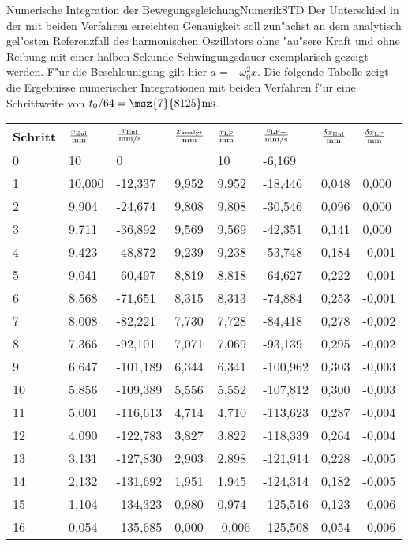 \begin{MXContent}{Numerische Integration der Bewegungsgleichung}{Numerik}{STD}
Der Unterschied in der mit beiden Verfahren erreichten Genauigkeit soll zun"achst an dem analytisch gel"osten Referenzfall des harmonischen Oszillators ohne "au"sere Kraft und ohne Reibung 
mit einer halben Sekunde Schwingungsdauer exemplarisch gezeigt werden. F"ur die Beschleunigung gilt hier $a=-\omega_0^2 x$. Die folgende Tabelle zeigt die Ergebnisse numerischer Integrationen mit beiden Verfahren f"ur eine Schrittweite von $t_0 / 64 = \msz{7}{8125}\mse{ms}$.

\begin{tabular}{|l|l|l|l|l|l|l|l|}
\hline
Schritt & 
$\frac{x_{\text{Eul}}}{\mathrm{mm}}$ & 
$\frac{v_{\text{Eul}}}{\mathrm{mm/s}}$ & 
$\frac{x_{\text{analyt}}}{\mathrm{mm}}$ & 
$\frac{x_{\text{LF}}}{\mathrm{mm}}$ & 
$\frac{v_{\text{LF+}}}{\mathrm{mm/s}}$ & 
$\frac{\delta x_{\text{Eul}}}{\mathrm{mm}}$ & 
$\frac{\delta x_{\text{LF}}}{\mathrm{mm}}$\\\hline
0 & 10 & 0 &   & 10 & -6,169 &  & \\\hline
1&10,000&-12,337&9,952&9,952&-18,446&0,048&0,000\\\hline
2&9,904&-24,674&9,808&9,808&-30,546&0,096&0,000\\\hline
3&9,711&-36,892&9,569&9,569&-42,351&0,141&0,000\\\hline
4&9,423&-48,872&9,239&9,238&-53,748&0,184&-0,001\\\hline
5&9,041&-60,497&8,819&8,818&-64,627&0,222&-0,001\\\hline
6&8,568&-71,651&8,315&8,313&-74,884&0,253&-0,001\\\hline
7&8,008&-82,221&7,730&7,728&-84,418&0,278&-0,002\\\hline
8&7,366&-92,101&7,071&7,069&-93,139&0,295&-0,002\\\hline
9&6,647&-101,189&6,344&6,341&-100,962&0,303&-0,003\\\hline
10&5,856&-109,389&5,556&5,552&-107,812&0,300&-0,003\\\hline
11&5,001&-116,613&4,714&4,710&-113,623&0,287&-0,004\\\hline
12&4,090&-122,783&3,827&3,822&-118,339&0,264&-0,004\\\hline
13&3,131&-127,830&2,903&2,898&-121,914&0,228&-0,005\\\hline
14&2,132&-131,692&1,951&1,945&-124,314&0,182&-0,005\\\hline
15&1,104&-134,323&0,980&0,974&-125,516&0,123&-0,006\\\hline
16&0,054&-135,685&0,000&-0,006&-125,508&0,054&-0,006\\\hline

\end{tabular}
\end{MXContent}
